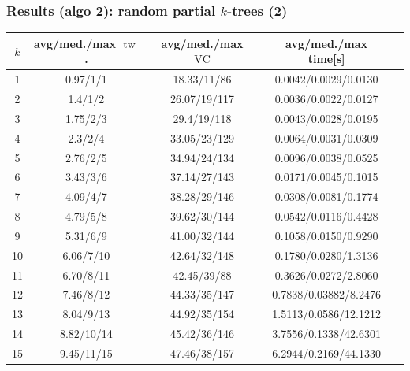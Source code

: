 \documentclass[11pt]{beamer}
\DeclareMathOperator{\tw}{tw}
\DeclareMathOperator{\VC}{VC}
\begin{document}
\begin{frame}
\frametitle{Results (algo 2): random partial $k$-trees (2)}

\begin{center}
\footnotesize
\begin{table}[h!]
\centering
\begin{tabular}{|c|c|c|c|c|}
\hline
$k$ & avg/med./max $\tw$. & avg/med./max $\VC$ & avg/med./max time[s] \\
\hline \hline
1 & 0.97/1/1 & 18.33/11/86 & 0.0042/0.0029/0.0130 \\
\hline
2 & 1.4/1/2 & 26.07/19/117 & 0.0036/0.0022/0.0127 \\
\hline
3 & 1.75/2/3 & 29.4/19/118 & 0.0043/0.0028/0.0195 \\
\hline
4 & 2.3/2/4 & 33.05/23/129 & 0.0064/0.0031/0.0309 \\
\hline
5 & 2.76/2/5 & 34.94/24/134 & 0.0096/0.0038/0.0525 \\
\hline
6 & 3.43/3/6 & 37.14/27/143 & 0.0171/0.0045/0.1015 \\
\hline
7 & 4.09/4/7 & 38.28/29/146 & 0.0308/0.0081/0.1774 \\
\hline
8 & 4.79/5/8 & 39.62/30/144 & 0.0542/0.0116/0.4428 \\
\hline
9 & 5.31/6/9 & 41.00/32/144 & 0.1058/0.0150/0.9290 \\
\hline
10 & 6.06/7/10 & 42.64/32/148 & 0.1780/0.0280/1.3136 \\
\hline
11 & 6.70/8/11 & 42.45/39/88 & 0.3626/0.0272/2.8060 \\
\hline
12 & 7.46/8/12 & 44.33/35/147 & 0.7838/0.03882/8.2476 \\
\hline
13 & 8.04/9/13 & 44.92/35/154 & 1.5113/0.0586/12.1212 \\
\hline
14 & 8.82/10/14 & 45.42/36/146 & 3.7556/0.1338/42.6301 \\
\hline
15 & 9.45/11/15 & 47.46/38/157 & 6.2944/0.2169/44.1330 \\
\hline
\end{tabular}
\end{table}
\end{center}

\end{frame}
\end{document}
